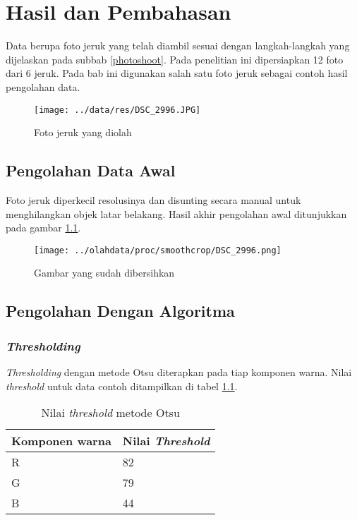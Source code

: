 \documentclass[laporan.tex]{subfiles}
\begin{document}
\chapter{Hasil dan Pembahasan}

Data berupa foto jeruk yang telah diambil sesuai dengan langkah-langkah yang dijelaskan pada subbab \ref{photoshoot}. Pada penelitian ini dipersiapkan 12 foto dari 6 jeruk. Pada bab ini digunakan salah satu foto jeruk sebagai contoh hasil pengolahan data.

\begin{figure}[h]
\centering
\texttt{[image: ../data/res/DSC\_2996.JPG]}
\caption{Foto jeruk yang diolah}
\end{figure}

\section{Pengolahan Data Awal}

Foto jeruk diperkecil resolusinya dan disunting secara manual untuk menghilangkan objek latar belakang. Hasil akhir pengolahan awal ditunjukkan pada gambar \ref{fig:imgedited}.

\begin{figure}[h!]
\centering
\texttt{[image: ../olahdata/proc/smoothcrop/DSC\_2996.png]}
\caption{Gambar yang sudah dibersihkan}
\label{fig:imgedited}
\end{figure}

\section{Pengolahan Dengan Algoritma}

\subsection{\emph{Thresholding}}

\emph{Thresholding} dengan metode Otsu diterapkan pada tiap komponen warna. Nilai \emph{threshold} untuk data contoh ditampilkan di tabel \ref{table:threshval}.

\begin{table}[h]
\centering
\begin{tabular}{|l|l|}
\hline
Komponen warna & Nilai \emph{Threshold} \\
\hline
R & 82 \\
G & 79 \\
B & 44 \\
\hline
\end{tabular}
\caption{Nilai \emph{threshold} metode Otsu}
\label{table:threshval}
\end{table}
\end{document}
